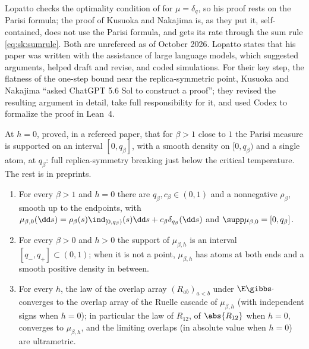 \begin{refsection}
Lopatto checks the optimality condition of \textcite{JagannathTobasco2017a} for $\mu=\delta_q$, so his proof rests on the Parisi formula; the proof of Kusuoka and Nakajima is, as they put it, self-contained, does not use the Parisi formula, and gets its rate through the sum rule \eqref{eq:sk:sumrule}. Both are unrefereed as of October 2026. Lopatto states that his paper was written with the assistance of large language models, which suggested arguments, helped draft and revise, and coded simulations. For their key step, the flatness of the one-step bound near the replica-symmetric point, Kusuoka and Nakajima \enquote{asked ChatGPT 5.6 Sol to construct a proof}; they revised the resulting argument in detail, take full responsibility for it, and used Codex to formalize the proof in Lean~4.

At $h=0$, \textcite[Thm.~1 and Cor.~2]{Zhou2026} proved, in a refereed paper, that for $\beta>1$ close to $1$ the Parisi measure is supported on an interval $[0,q_\beta]$, with a smooth density on $[0,q_\beta)$ and a single atom, at $q_\beta$: full replica-symmetry breaking just below the critical temperature. The rest is in preprints.

\begin{theorem}\label{thm:sk:overlap}
\leavevmode
\begin{enumerate}
\item \parencite[Thm.~1.1]{Lopatto2026b} For every $\beta>1$ and $h=0$ there are $q_\beta,c_\beta\in(0,1)$ and a nonnegative $\rho_\beta$, smooth up to the endpoints, with $\mu_{\beta,0}(\dd s)=\rho_\beta(s)\ind_{[0,q_\beta)}(s)\dd s+c_\beta\delta_{q_\beta}(\dd s)$ and $\supp\mu_{\beta,0}=[0,q_\beta]$.
\item \parencite[Thm.~1.1]{Lopatto2026c} For every $\beta>0$ and $h>0$ the support of $\mu_{\beta,h}$ is an interval $[q_-,q_+]\subset(0,1)$; when it is not a point, $\mu_{\beta,h}$ has atoms at both ends and a smooth positive density in between.
\item \parencite[Thm.~1.2 and Cor.~1.4]{AronowLopatto2026b} For every $h$, the law of the overlap array $(R_{ab})_{a<b}$ under $\E\gibbs\cdot$ converges to the overlap array of the Ruelle cascade of $\mu_{\beta,h}$ (with independent signs when $h=0$); in particular the law of $R_{12}$, of $\abs{R_{12}}$ when $h=0$, converges to $\mu_{\beta,h}$, and the limiting overlaps (in absolute value when $h=0$) are ultrametric.
\end{enumerate}
\end{theorem}


\end{refsection}
